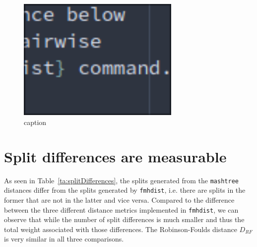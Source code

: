 \begin{figure}
  \centering
  \includegraphics[width=0.7\textwidth]{figures/image.png}
  \caption{caption}
  \label{fig:mandalMashOutline}
\end{figure}


\section{Split differences are measurable}
As seen in Table~\ref{ta:splitDifferences}, the splits generated from the
\texttt{mashtree} distances differ from the splits generated by
\texttt{fmhdist}, i.e. there are splits in the former that are not in the latter
and vice versa. Compared to the difference between the three different distance
metrics implemented in \texttt{fmhdist}, we can observe that while the number of
split differences is much smaller and thus the total weight associated with
those differences. The Robinson-Foulds distance $D_{RF}$ is very similar in all
three comparisons.

